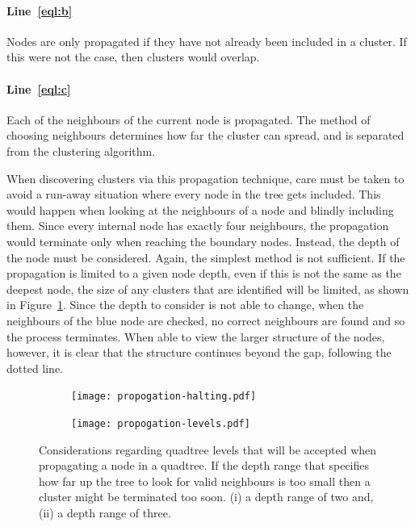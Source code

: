 \paragraph{Line~\ref{eql:b}} Nodes are only propagated if they have not already
been included in a cluster. If this were not the case, then clusters would
overlap.

\paragraph{Line~\ref{eql:c}} Each of the neighbours of the current node is
propagated. The method of choosing neighbours determines how far the cluster
can spread, and is separated from the clustering algorithm.

When discovering clusters via this propagation technique, care must be taken to
avoid a run-away situation where every node in the tree gets included. This
would happen when looking at the neighbours of a node and blindly including
them. Since every internal node has exactly four neighbours, the propagation
would terminate only when reaching the boundary nodes. Instead, the depth of
the node must be considered. Again, the simplest method is not sufficient. If
the propagation is limited to a given node depth, even if this is not the same
as the deepest node, the size of any clusters that are identified will be
limited, as shown in Figure~\ref{fig:propogation-halting}.  Since the depth to
consider is not able to change, when the neighbours of the blue node are
checked, no correct neighbours are found and so the process terminates. When
able to view the larger structure of the nodes, however, it is clear that the
structure continues beyond the gap, following the dotted line.

\begin{figure}[tbh]
	\centering
	\begin{subfigure}[c]{5.2cm}
		\texttt{[image: propogation-halting.pdf]}
		\caption{}\label{fig:propogation-halting}
	\end{subfigure}%
	\quad
	\begin{subfigure}[c]{3.2cm}
		\texttt{[image: propogation-levels.pdf]}
		\caption{}\label{fig:propogation-levels}
	\end{subfigure}

	\caption[Considerations regarding quadtree levels to be
	accepted.]{Considerations regarding quadtree levels that will be accepted
		when propagating a node in a quadtree. 
		If the depth range that specifies how far up the tree to look for valid
		neighbours is too small then a cluster might be terminated too soon.
		(i) a depth range of two and, (ii) a
		depth range of three.}\label{fig:prop-levels-halting}
\end{figure}

